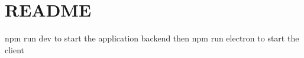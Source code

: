 \chapter{README}
\hypertarget{md__2_users_2hello_2_documents_2_git_hub_2finalproject-engine-drop-table-engines_2_engine_2src_2editor_2_r_e_a_d_m_e}{}\label{md__2_users_2hello_2_documents_2_git_hub_2finalproject-engine-drop-table-engines_2_engine_2src_2editor_2_r_e_a_d_m_e}
{\ttfamily npm run dev} to start the application backend then {\ttfamily npm run electron} to start the client 